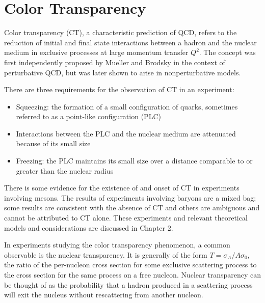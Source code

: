 \section{Color Transparency}
Color transparency (CT), a characteristic prediction of QCD, refers to the
reduction of initial and final state interactions between a hadron and the
nuclear medium in exclusive processes at large momentum transfer $Q^2$.
The concept was first independently proposed by Mueller and Brodsky in the
context of perturbative QCD, but was later shown to arise in nonperturbative
models.


There are three requirements for the observation of CT in an experiment:
\begin{itemize}
    \item Squeezing: the formation of a small configuration of quarks, sometimes
          referred to as a point-like configuration (PLC)
    \item Interactions between the PLC and the nuclear medium are attenuated
          because of its small size
    \item Freezing: the PLC maintains its small size over a distance comparable
          to or greater than the nuclear radius
\end{itemize}

There is some evidence for the existence of and onset of CT in experiments
involving mesons.
The results of experiments involving baryons are a mixed bag; some results are
consistent with the absence of CT and others are ambiguous and cannot be
attributed to CT alone.
These experiments and relevant theoretical models and considerations are
discussed in Chapter 2.


In experiments studying the color transparency phenomenon, a common observable
is the nuclear transparency.
It is generally of the form $T=\sigma_A/A\sigma_0$,
the ratio of
the per-nucleon cross section for some exclusive scattering process
to
the cross section for the same process on a free nucleon.
Nuclear transparency can be thought of as the probability that a hadron
produced in a scattering process will exit the nucleus without rescattering
from another nucleon.


